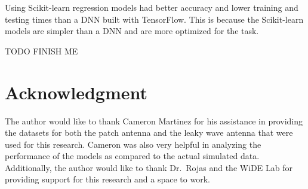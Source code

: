 \documentclass[lettersize,journal]{IEEEtran}
\begin{document}
Using Scikit-learn regression models had better accuracy and lower training and testing times than a DNN built with TensorFlow. This is because the Scikit-learn models are simpler than a DNN and are more optimized for the task.  

TODO FINISH ME 


\section*{Acknowledgment}
The author would like to thank Cameron Martinez for his assistance in providing the datasets for both the patch antenna and the leaky wave antenna that were used for this research. Cameron was also very helpful in analyzing the performance of the models as compared to the actual simulated data. Additionally, the author would like to thank Dr.~Rojas and the WiDE Lab for providing support for this research and a space to work.





\vfill
\end{document}
